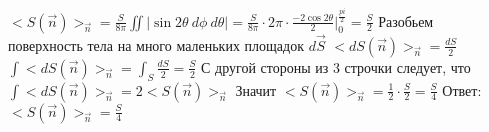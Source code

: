 	\newline
	$<S(\vec{n})>_{\vec{n}} = \frac{S}{8\pi} \iint \mid  \sin 2\theta \: d\phi \: d\theta \mid  = \frac{S}{8\pi} \cdot 2\pi \cdot \frac{-2\cos 2\theta}{2} \bigg|_{0}^{\frac{pi}{2}} = \frac{S}{2}$
	\newline
	Разобьем поверхность тела на много маленьких площадок $d \vec{S}$
	\newline
	$<dS(\vec{n})>_{\vec{n}} = \frac{dS}{2}$
	\newline
	$\int <dS(\vec{n})>_{\vec{n}} = \int_S \frac{dS}{2} = \frac{S}{2}$
	\newline
	С другой стороны из 3 строчки следует, что $\int <dS(\vec{n})>_{\vec{n}} = 2 <S(\vec{n})>_{\vec{n}} $
	\newline
	Значит $<S(\vec{n})>_{\vec{n}} = \frac{1}{2} \cdot \frac{S}{2} = \frac{S}{4} $
	\newline
	Ответ: $<S(\vec{n})>_{\vec{n}} = \frac{S}{4}$

